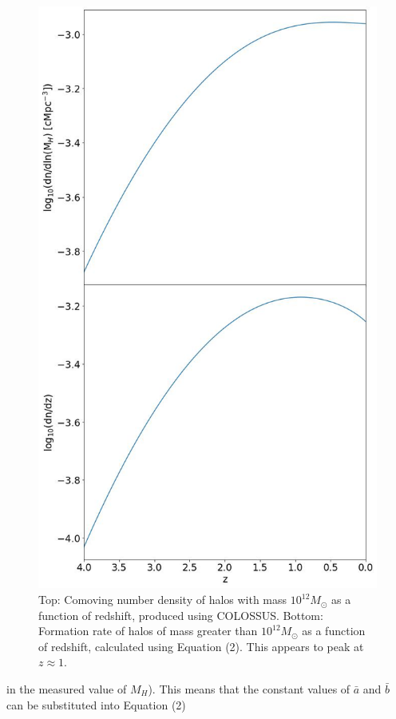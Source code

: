 \documentclass[12pt]{article}%
\begin{document}
\begin{figure}[H]
\centering
\includegraphics[width=12.5cm]{Plot_6.jpeg}
\caption{Top: Comoving number density of halos with mass $10^{12}M_\odot$ as a function of redshift, produced using COLOSSUS. Bottom: Formation rate of halos of mass greater than $10^{12}M_\odot$ as a function of redshift, calculated using Equation (2). This appears to peak at $z\approx1$.}
\label{fig:6}
\end{figure}
\newpage
\twocolumngrid


\noindent in the measured value of $M_H$). This means that the constant values of $\bar a$ and $\bar b$ can be substituted into Equation (2)
\end{document}
